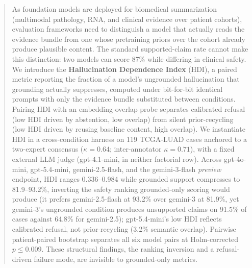 \documentclass{article}
\theoremstyle{plain}
\begin{document}

\printAffiliationsAndNotice{}

\begin{abstract}
As foundation models are deployed for biomedical summarization (multimodal pathology, RNA, and clinical evidence over patient cohorts), evaluation frameworks need to distinguish a model that actually reads the evidence bundle from one whose pretraining priors over the cohort already produce plausible content. The standard supported-claim rate cannot make this distinction: two models can score 87\% while differing in clinical safety. We introduce the \textbf{Hallucination Dependence Index} (HDI), a paired metric reporting the fraction of a model's ungrounded hallucination that grounding actually suppresses, computed under bit-for-bit identical prompts with only the evidence bundle substituted between conditions. Pairing HDI with an embedding-overlap probe separates calibrated refusal (low HDI driven by abstention, low overlap) from silent prior-recycling (low HDI driven by reusing baseline content, high overlap). We instantiate HDI in a cross-condition harness on 119 TCGA-LUAD cases anchored to a two-expert consensus ($\kappa{=}0.64$; inter-annotator $\kappa{=}0.71$), with a fixed external LLM judge (gpt-4.1-mini, in neither factorial row). Across gpt-4o-mini, gpt-5.4-mini, gemini-2.5-flash, and the gemini-3-flash \emph{preview} endpoint, HDI ranges 0.336--0.984 while grounded support compresses to 81.9--93.2\%, inverting the safety ranking grounded-only scoring would produce (it prefers gemini-2.5-flash at 93.2\% over gemini-3 at 81.9\%, yet gemini-3's ungrounded condition produces unsupported claims on 91.5\% of cases against 64.8\% for gemini-2.5); gpt-5.4-mini's low HDI reflects calibrated refusal, not prior-recycling (3.2\% semantic overlap). Pairwise patient-paired bootstrap separates all six model pairs at Holm-corrected $p \leq 0.009$. These structural findings, the ranking inversion and a refusal-driven failure mode, are invisible to grounded-only metrics.
\end{abstract}
\end{document}

